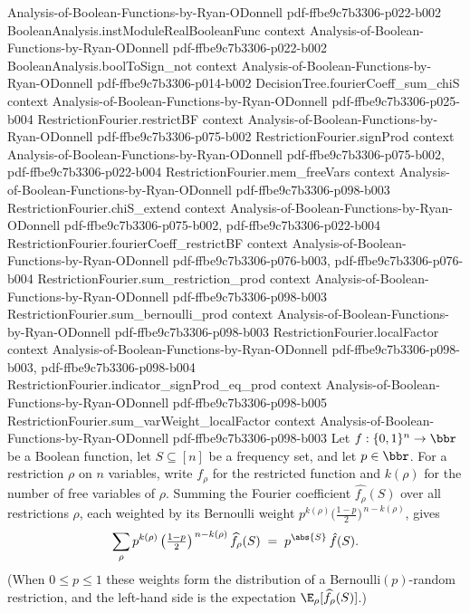 \begin{theorem}
  {Analysis-of-Boolean-Functions-by-Ryan-ODonnell}
  {pdf-ffbe9c7b3306-p022-b002}
\proofstep
  {BooleanAnalysis.instModuleRealBooleanFunc}
  {context}
  {Analysis-of-Boolean-Functions-by-Ryan-ODonnell}
  {pdf-ffbe9c7b3306-p022-b002}
\proofstep
  {BooleanAnalysis.boolToSign_not}
  {context}
  {Analysis-of-Boolean-Functions-by-Ryan-ODonnell}
  {pdf-ffbe9c7b3306-p014-b002}
\proofstep
  {DecisionTree.fourierCoeff_sum_chiS}
  {context}
  {Analysis-of-Boolean-Functions-by-Ryan-ODonnell}
  {pdf-ffbe9c7b3306-p025-b004}
\proofstep
  {RestrictionFourier.restrictBF}
  {context}
  {Analysis-of-Boolean-Functions-by-Ryan-ODonnell}
  {pdf-ffbe9c7b3306-p075-b002}
\proofstep
  {RestrictionFourier.signProd}
  {context}
  {Analysis-of-Boolean-Functions-by-Ryan-ODonnell}
  {pdf-ffbe9c7b3306-p075-b002,
    pdf-ffbe9c7b3306-p022-b004}
\proofstep
  {RestrictionFourier.mem_freeVars}
  {context}
  {Analysis-of-Boolean-Functions-by-Ryan-ODonnell}
  {pdf-ffbe9c7b3306-p098-b003}
\proofstep
  {RestrictionFourier.chiS_extend}
  {context}
  {Analysis-of-Boolean-Functions-by-Ryan-ODonnell}
  {pdf-ffbe9c7b3306-p075-b002,
    pdf-ffbe9c7b3306-p022-b004}
\proofstep
  {RestrictionFourier.fourierCoeff_restrictBF}
  {context}
  {Analysis-of-Boolean-Functions-by-Ryan-ODonnell}
  {pdf-ffbe9c7b3306-p076-b003,
    pdf-ffbe9c7b3306-p076-b004}
\proofstep
  {RestrictionFourier.sum_restriction_prod}
  {context}
  {Analysis-of-Boolean-Functions-by-Ryan-ODonnell}
  {pdf-ffbe9c7b3306-p098-b003}
\proofstep
  {RestrictionFourier.sum_bernoulli_prod}
  {context}
  {Analysis-of-Boolean-Functions-by-Ryan-ODonnell}
  {pdf-ffbe9c7b3306-p098-b003}
\proofstep
  {RestrictionFourier.localFactor}
  {context}
  {Analysis-of-Boolean-Functions-by-Ryan-ODonnell}
  {pdf-ffbe9c7b3306-p098-b003,
    pdf-ffbe9c7b3306-p098-b004}
\proofstep
  {RestrictionFourier.indicator_signProd_eq_prod}
  {context}
  {Analysis-of-Boolean-Functions-by-Ryan-ODonnell}
  {pdf-ffbe9c7b3306-p098-b005}
\proofstep
  {RestrictionFourier.sum_varWeight_localFactor}
  {context}
  {Analysis-of-Boolean-Functions-by-Ryan-ODonnell}
  {pdf-ffbe9c7b3306-p098-b003}
Let $f:\{0,1\}^n\to\bbr$ be a Boolean function, let $S\subseteq[n]$ be a frequency set,
and let $p\in\bbr$. For a restriction $\rho$ on $n$ variables, write $f_\rho$ for the
restricted function and $k(\rho)$ for the number of free variables of $\rho$. Summing
the Fourier coefficient $\widehat{f_\rho}(S)$ over all restrictions $\rho$, each
weighted by its Bernoulli weight $p^{k(\rho)}\bigl(\tfrac{1-p}{2}\bigr)^{\,n-k(\rho)}$,
gives
\[
  \sum_{\rho} p^{k(\rho)}\left(\tfrac{1-p}{2}\right)^{\,n-k(\rho)}\widehat{f_\rho}(S)
  \;=\; p^{\abs{S}}\,\hat f(S).
\]
(When $0\le p\le 1$ these weights form the distribution of a Bernoulli$(p)$-random
restriction, and the left-hand side is the expectation $\E_\rho[\widehat{f_\rho}(S)]$.)
\end{theorem}

